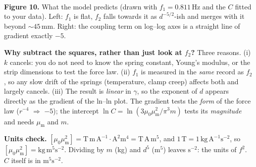 \documentclass[11pt,a4paper]{article}
\newcommand{\muz}{\mu_0}
\newcommand{\mum}{\mu_{\mathrm m}}
\newcommand{\un}[1]{\,\mathrm{#1}}
\begin{document}
\begin{center}
\hfill
{}\\[2pt]
{\small\textbf{Figure 10.} What the model predicts (drawn with $f_1=0.811\un{Hz}$ and the $C$ fitted to your data). Left: $f_1$ is flat, $f_2$ falls towards it as $d^{-5/2}$-ish and merges with it beyond $\sim45\un{mm}$. Right: the coupling term on log--log axes is a straight line of gradient exactly $-5$.}
\end{center}

\textbf{Why subtract the squares, rather than just look at $f_2$?} Three reasons. (i) $k$ cancels: you do not need to know the spring constant, Young's modulus, or the strip dimensions to test the force law. (ii) $f_1$ is measured in the \emph{same} record as $f_2$, so any slow drift of the springs (temperature, clamp creep) affects both and largely cancels. (iii) The result is \emph{linear} in $\gamma$, so the exponent of $d$ appears directly as the gradient of the ln--ln plot. The gradient tests the \emph{form} of the force law ($r^{-4}$ $\Rightarrow$ $-5$); the intercept $\ln C=\ln(3\muz\mum^2/\pi^3m)$ tests its \emph{magnitude} and needs $\mum$ and $m$.

\textbf{Units check.} $[\muz\mum^2]=\mathrm{T\,m\,A^{-1}\cdot A^2m^4}=\mathrm{T\,A\,m^5}$, and $1\un{T}=1\un{kg\,A^{-1}s^{-2}}$, so $[\muz\mum^2]=\mathrm{kg\,m^5s^{-2}}$. Dividing by $m$ (kg) and $d^5$ ($\mathrm{m^5}$) leaves $\mathrm{s^{-2}}$: the units of $f^2$. $C$ itself is in $\mathrm{m^5s^{-2}}$.
\end{document}
